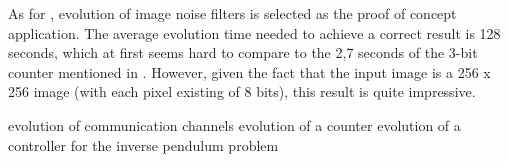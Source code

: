 As for \cite{dpr}, evolution of image noise filters is selected as the proof of concept application. The average evolution time needed to achieve a correct result is 128 seconds, which at first seems hard to compare to the 2,7 seconds of the 3-bit counter mentioned in \cite{virtex4}. However, given the fact that the input image is a 256 x 256 image (with each pixel existing of 8 bits), this result is quite impressive. 

evolution of communication channels
evolution of a counter
evolution of a controller for the inverse pendulum problem
